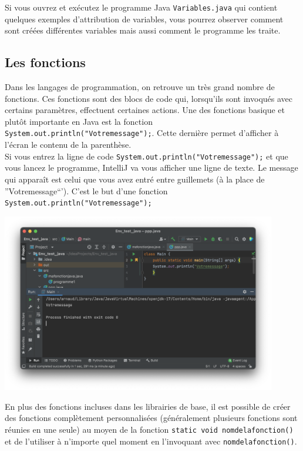 Si vous ouvrez et exécutez le programme Java \lstinline{Variables.java} qui contient quelques exemples d'attribution de variables, vous pourrez observer comment sont créées différentes variables mais aussi comment le programme les traite.

\subsection{Les fonctions}

Dans les langages de programmation, on retrouve un très grand nombre de fonctions. Ces fonctions sont des blocs de code qui, lorsqu'ils sont invoqués avec certains paramètres, effectuent certaines actions. Une des fonctions basique et plutôt importante en Java est la fonction \lstinline{System.out.println("Votremessage");}.  Cette dernière permet d'afficher à l'écran le contenu de la parenthèse.\\ 
Si vous entrez la ligne de code \lstinline{System.out.println("Votremessage");} et que vous lancez le programme, IntelliJ va vous afficher une ligne de texte. Le message qui apparaît est celui que vous avez entré entre guillemets (à la place de ''Votremessage``'). C'est le but d'une fonction \lstinline{System.out.println("Votremessage");}
\begin{center}
\includegraphics[width=12cm]{print}	
\end{center}


En plus des fonctions incluses dans les librairies de base, il est possible de créer des fonctions complètement personnalisées (généralement plusieurs fonctions sont réunies en une seule) au moyen de la fonction \lstinline{static void nomdelafonction() } et de l'utiliser à n'importe quel moment en l'invoquant avec \lstinline{nomdelafonction()}.

